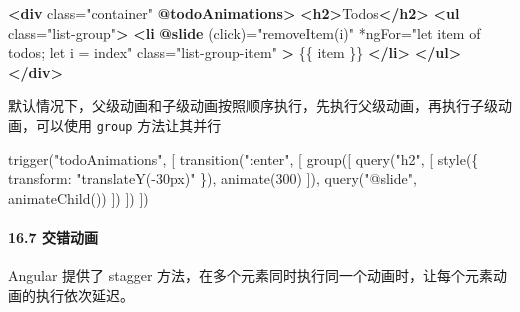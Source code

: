 \documentclass[
]{article}
\newenvironment{Shaded}{}{}
\newcommand{\DataTypeTok}[1]{\textcolor[rgb]{0.56,0.13,0.00}{#1}}
\newcommand{\DecValTok}[1]{\textcolor[rgb]{0.25,0.63,0.44}{#1}}
\newcommand{\ErrorTok}[1]{\textcolor[rgb]{1.00,0.00,0.00}{\textbf{#1}}}
\newcommand{\FunctionTok}[1]{\textcolor[rgb]{0.02,0.16,0.49}{#1}}
\newcommand{\KeywordTok}[1]{\textcolor[rgb]{0.00,0.44,0.13}{\textbf{#1}}}
\newcommand{\NormalTok}[1]{#1}
\newcommand{\OperatorTok}[1]{\textcolor[rgb]{0.40,0.40,0.40}{#1}}
\newcommand{\OtherTok}[1]{\textcolor[rgb]{0.00,0.44,0.13}{#1}}
\newcommand{\StringTok}[1]{\textcolor[rgb]{0.25,0.44,0.63}{#1}}
\begin{document}
\begin{Shaded}
\begin{Highlighting}[]
\KeywordTok{\textless{}div}\OtherTok{ class=}\StringTok{"container"} \ErrorTok{@todoAnimations}\KeywordTok{\textgreater{}}
  \KeywordTok{\textless{}h2\textgreater{}}\NormalTok{Todos}\KeywordTok{\textless{}/h2\textgreater{}}
  \KeywordTok{\textless{}ul}\OtherTok{ class=}\StringTok{"list{-}group"}\KeywordTok{\textgreater{}}
    \KeywordTok{\textless{}li}
      \ErrorTok{@slide}
\OtherTok{      (click)=}\StringTok{"removeItem(i)"}
\OtherTok{      *ngFor=}\StringTok{"let item of todos; let i = index"}
\OtherTok{      class=}\StringTok{"list{-}group{-}item"}
    \KeywordTok{\textgreater{}}
\NormalTok{      \{\{ item \}\}}
    \KeywordTok{\textless{}/li\textgreater{}}
  \KeywordTok{\textless{}/ul\textgreater{}}
\KeywordTok{\textless{}/div\textgreater{}}
\end{Highlighting}
\end{Shaded}

默认情况下，父级动画和子级动画按照顺序执行，先执行父级动画，再执行子级动画，可以使用
\texttt{group} 方法让其并行

\begin{Shaded}
\begin{Highlighting}[]
\FunctionTok{trigger}\NormalTok{(}\StringTok{"todoAnimations"}\OperatorTok{,}\NormalTok{ [}
  \FunctionTok{transition}\NormalTok{(}\StringTok{":enter"}\OperatorTok{,}\NormalTok{ [}
    \FunctionTok{group}\NormalTok{([}
      \FunctionTok{query}\NormalTok{(}\StringTok{"h2"}\OperatorTok{,}\NormalTok{ [}
        \FunctionTok{style}\NormalTok{(\{ }\DataTypeTok{transform}\OperatorTok{:} \StringTok{"translateY({-}30px)"}\NormalTok{ \})}\OperatorTok{,}
        \FunctionTok{animate}\NormalTok{(}\DecValTok{300}\NormalTok{)}
\NormalTok{      ])}\OperatorTok{,}
      \FunctionTok{query}\NormalTok{(}\StringTok{"@slide"}\OperatorTok{,} \FunctionTok{animateChild}\NormalTok{())}
\NormalTok{    ])}
\NormalTok{  ])}
\NormalTok{])}
\end{Highlighting}
\end{Shaded}

\hypertarget{167-ux4ea4ux9519ux52a8ux753b}{%
\paragraph{16.7 交错动画}\label{167-ux4ea4ux9519ux52a8ux753b}}

Angular 提供了 stagger
方法，在多个元素同时执行同一个动画时，让每个元素动画的执行依次延迟。
\end{document}
